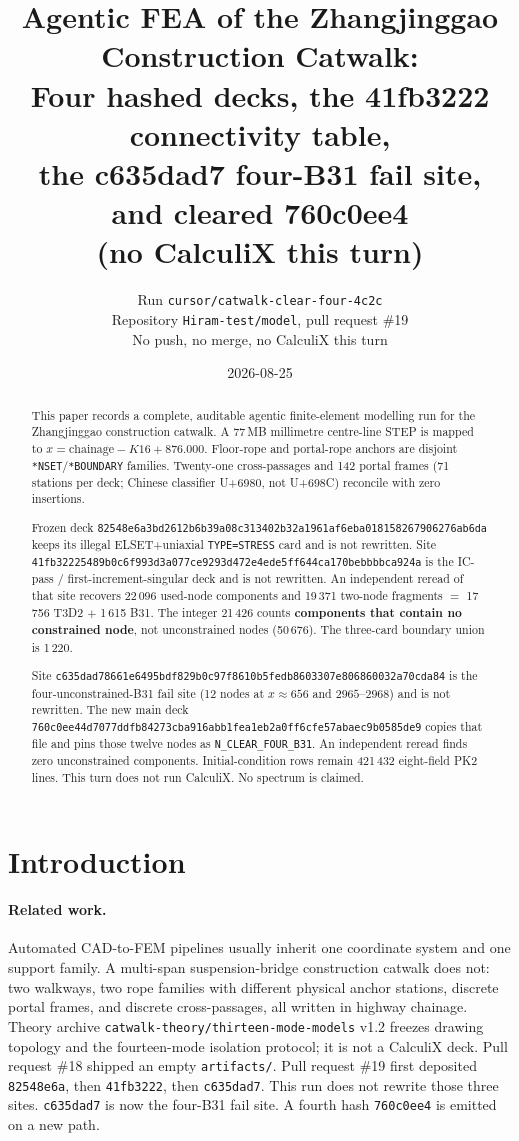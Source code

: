 \documentclass[11pt,a4paper]{article}
\title{Agentic FEA of the Zhangjinggao Construction Catwalk:\\
\large Four hashed decks, the 41fb3222 connectivity table,\\
the c635dad7 four-B31 fail site, and cleared 760c0ee4\\
(no CalculiX this turn)}
\author{Run \texttt{cursor/catwalk-clear-four-4c2c}\\
Repository \texttt{Hiram-test/model}, pull request \#19\\
No push, no merge, no CalculiX this turn}
\date{2026-08-25}
\begin{document}
\maketitle

\begin{abstract}
This paper records a complete, auditable agentic finite-element modelling run
for the Zhangjinggao construction catwalk. A 77\,MB millimetre centre-line STEP
is mapped to \(x=\mathrm{chainage}-K16+876.000\). Floor-rope and portal-rope
anchors are disjoint \texttt{*NSET}/\texttt{*BOUNDARY} families. Twenty-one
cross-passages and 142 portal frames (71 stations per deck; Chinese classifier
U+6980, not U+698C) reconcile with zero insertions.

Frozen deck
\texttt{82548e6a3bd2612b6b39a08c313402b32a1961af6eba018158267906276ab6da}
keeps its illegal ELSET+uniaxial \texttt{TYPE=STRESS} card and is not rewritten.
Site
\texttt{41fb32225489b0c6f993d3a077ce9293d472e4ede5ff644ca170bebbbbca924a}
is the IC-pass / first-increment-singular deck and is not rewritten. An
independent reread of that site recovers 22\,096 used-node components and
19\,371 two-node fragments \(=\) 17\,756 T3D2 \(+\) 1\,615 B31. The integer
21\,426 counts \textbf{components that contain no constrained node}, not
unconstrained nodes (50\,676). The three-card boundary union is 1\,220.

Site
\texttt{c635dad78661e6495bdf829b0c97f8610b5fedb8603307e806860032a70cda84}
is the four-unconstrained-B31 fail site (12 nodes at \(x\approx 656\) and
\(2965\)--\(2968\)) and is not rewritten. The new main deck
\texttt{760c0ee44d7077ddfb84273cba916abb1fea1eb2a0ff6cfe57abaec9b0585de9}
copies that file and pins those twelve nodes as \texttt{N\_CLEAR\_FOUR\_B31}.
An independent reread finds zero unconstrained components. Initial-condition
rows remain 421\,432 eight-field PK2 lines. This turn does not run CalculiX.
No spectrum is claimed.
\end{abstract}

\tableofcontents
\listoftables

\section{Introduction}
\label{sec:intro}

\paragraph{Related work.}
Automated CAD-to-FEM pipelines usually inherit one coordinate system and one
support family. A multi-span suspension-bridge construction catwalk does not:
two walkways, two rope families with different physical anchor stations,
discrete portal frames, and discrete cross-passages, all written in highway
chainage. Theory archive \texttt{catwalk-theory/thirteen-mode-models} v1.2
freezes drawing topology and the fourteen-mode isolation protocol; it is not
a CalculiX deck. Pull request \#18 shipped an empty \texttt{artifacts/}.
Pull request \#19 first deposited \texttt{82548e6a}, then \texttt{41fb3222},
then \texttt{c635dad7}. This run does not rewrite those three sites.
\texttt{c635dad7} is now the four-B31 fail site. A fourth hash
\texttt{760c0ee4} is emitted on a new path.
\end{document}
